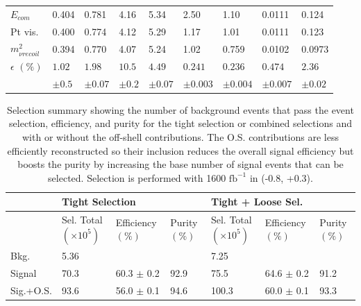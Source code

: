 \begin{table}
\begin{tabular}{|p{}|p{}p{}p{}p{}p{}p{}p{}p{}|}
$E_{com}$ & {0.404 } &  {0.781 } &  {4.16} & {5.34} &  {2.50} &  {1.10} &  {0.0111} &  {0.124} \\ 

Pt vis. & {0.400 } &  {0.774 } &  {4.12} & {5.29} &  {1.17} &  {1.01} &  {0.0111} &  {0.123} \\ 
 
$m^2_{\nu recoil}$ & {0.394 } &  {0.770 } &  {4.07} & {5.24} &  {1.02} &  {0.759} &  {0.0102} &  {0.0973} \\ 
\hline 
 $\epsilon \, \, (\%)$ & $1.02 $ & $1.98 $ & $10.5 $ &  $4.49 $ & $0.241 $ & $0.236 $ & $0.474 $ & $2.36 $ \\ 

  	     & $\pm 0.5$ & $\pm 0.07$ & $\pm 0.2$ & $\pm 0.07$ & $\pm 0.003$ & $\pm 0.004$ & $\pm 0.007$ & $\pm 0.02$ \\

 \hline
 \end{tabular}

\end{table}



\begin{table}
\caption{Selection summary showing the number of background events that pass the event selection, efficiency, and purity for the tight selection or combined selections and with or without the off-shell contributions.  The O.S. contributions are less efficiently reconstructed so their inclusion reduces the overall signal efficiency but boosts the purity by increasing the base number of signal events that can be selected. Selection is performed with 1600 $\text{fb}^{-1}$ in (-0.8, +0.3). }
\label{tab:summary}
 \begin{tabular}{ |p{}|p{}p{}|p{}|p{}p{}p{}|} 
 \hline 
   &  \multicolumn{3}{|l|}{Tight Selection} &  \multicolumn{3}{|l|}{ Tight + Loose Sel.}  \\  \hline  
 & Sel. Total $(\times 10^5)$ & Efficiency $(\%)$ & Purity $(\%)$ & Sel. Total $(\times 10^5)$ & Efficiency $(\%)$& Purity $(\%)$ \\ 
 \hline  
 Bkg. &  {5.36} & & &  {7.25} & &  \\ 
 Signal &  {70.3} & 60.3 $\pm$ 0.2 & 92.9  &  {75.5} & 64.6 $\pm$ 0.2 & 91.2 \\ 
 Sig.+O.S. &  {93.6} & 56.0 $\pm$ 0.1 & 94.6 &  {100.3} & 60.0 $\pm$ 0.1 & 93.3 \\ 
\hline 
\end{tabular} 
\end{table}




